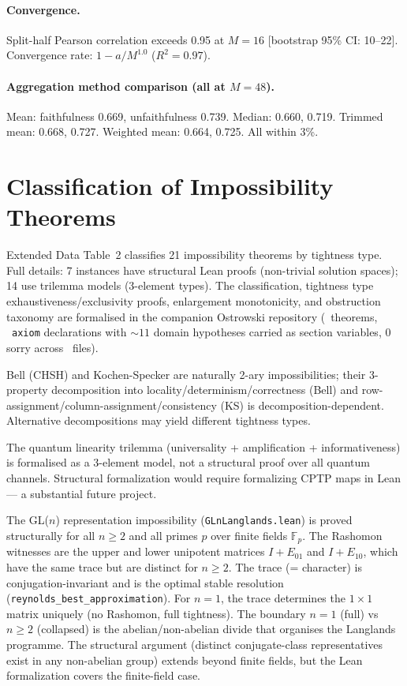 \documentclass[11pt]{article}
\begin{document}
\paragraph{Convergence.}
Split-half Pearson correlation exceeds 0.95 at $M = 16$ [bootstrap 95\% CI: 10--22].  Convergence rate: $1 - a/M^{1.0}$ ($R^2 = 0.97$).

\paragraph{Aggregation method comparison (all at $M = 48$).}
Mean: faithfulness 0.669, unfaithfulness 0.739.  Median: 0.660, 0.719.  Trimmed mean: 0.668, 0.727.  Weighted mean: 0.664, 0.725.  All within 3\%.

\section{Classification of Impossibility Theorems}
\label{sec:classification-si}

Extended Data Table~2 classifies 21 impossibility theorems by tightness type.  Full details: 7 instances have structural Lean proofs (non-trivial solution spaces); 14 use trilemma models (3-element types).  The classification, tightness type exhaustiveness/exclusivity proofs, enlargement monotonicity, and obstruction taxonomy are formalised in the companion Ostrowski repository (\ClaimOstrowskiTheorems~theorems, \ClaimOstrowskiAxioms~\texttt{axiom} declarations with ${\sim}11$ domain hypotheses carried as section variables, 0 sorry across \ClaimOstrowskiFiles~files).

Bell (CHSH) and Kochen-Specker are naturally 2-ary impossibilities; their 3-property decomposition into locality/determinism/correctness (Bell) and row-assignment/column-assignment/consistency (KS) is decomposition-dependent.  Alternative decompositions may yield different tightness types.

The quantum linearity trilemma (universality + amplification + informativeness) is formalised as a 3-element model, not a structural proof over all quantum channels.  Structural formalization would require formalizing CPTP maps in Lean --- a substantial future project.

The GL($n$) representation impossibility (\texttt{GLnLanglands.lean}) is proved structurally for all $n \geq 2$ and all primes $p$ over finite fields $\mathbb{F}_p$.  The Rashomon witnesses are the upper and lower unipotent matrices $I + E_{01}$ and $I + E_{10}$, which have the same trace but are distinct for $n \geq 2$.  The trace (= character) is conjugation-invariant and is the optimal stable resolution (\texttt{reynolds\_best\_approximation}).  For $n = 1$, the trace determines the $1 \times 1$ matrix uniquely (no Rashomon, full tightness).  The boundary $n = 1$ (full) vs $n \geq 2$ (collapsed) is the abelian/non-abelian divide that organises the Langlands programme.  The structural argument (distinct conjugate-class representatives exist in any non-abelian group) extends beyond finite fields, but the Lean formalization covers the finite-field case.
\end{document}
